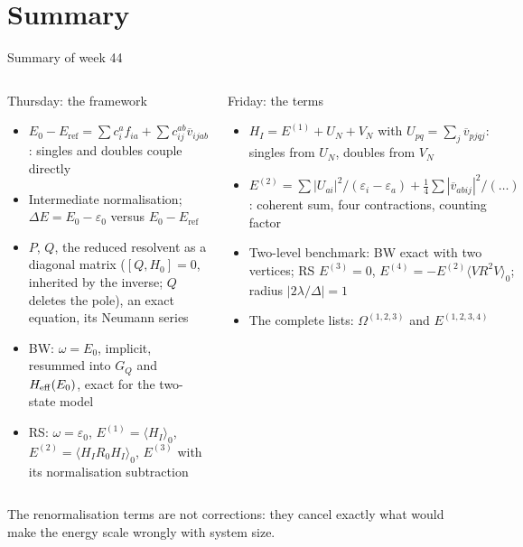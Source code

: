 \documentclass[aspectratio=169,10pt]{beamer}
\newcommand{\av}[1]{\langle #1\rangle_0}
\newcommand{\vbar}[4]{\overline v_{#1#2#3#4}}
\newcommand{\Eref}{E_{\mathrm{ref}}}
\begin{document}
\section{Summary}

\begin{frame}[shrink=5]{Summary of week 44}
  \small
  \begin{columns}[T]
    \begin{block}{Thursday: the framework}
      \begin{itemize}
        \item \(E_0-\Eref=\sum c_i^af_{ia}+\sum c_{ij}^{ab}\vbar{i}{j}{a}{b}\): singles and doubles couple directly
        \item Intermediate normalisation; \(\Delta E=E_0-\varepsilon_0\) versus \(E_0-\Eref\)
        \item \(P\), \(Q\), the reduced resolvent as a diagonal matrix (\([Q,H_0]=0\), inherited by the inverse; \(Q\) deletes the pole), an exact equation, its Neumann series
        \item BW: \(\omega=E_0\), implicit, resummed into \(G_Q\) and \(H_{\rm eff}(E_0)\), exact for the two-state model
        \item RS: \(\omega=\varepsilon_0\), \(E^{(1)}=\av{H_I}\), \(E^{(2)}=\av{H_IR_0H_I}\), \(E^{(3)}\) with its normalisation subtraction
      \end{itemize}
    \end{block}
    \begin{block}{Friday: the terms}
      \begin{itemize}
        \item \(H_I=E^{(1)}+U_N+V_N\) with \(U_{pq}=\sum_j\vbar{p}{j}{q}{j}\): singles from \(U_N\), doubles from \(V_N\)
        \item \(E^{(2)}=\sum|U_{ai}|^2/(\varepsilon_i-\varepsilon_a)+\frac14\sum|\vbar{a}{b}{i}{j}|^2/(\ldots)\): coherent sum, four contractions, counting factor
        \item Two-level benchmark: BW exact with two vertices; RS \(E^{(3)}=0\), \(E^{(4)}=-E^{(2)}\av{VR^2V}\); radius \(|2\lambda/\Delta|=1\)
        \item The complete lists: \(\Omega^{(1,2,3)}\) and \(E^{(1,2,3,4)}\)
      \end{itemize}
    \end{block}
  \end{columns}
  \vspace{0.3em}
  \centering The renormalisation terms are not corrections: they cancel exactly what would make the energy scale wrongly with system size.
\end{frame}
\end{document}
